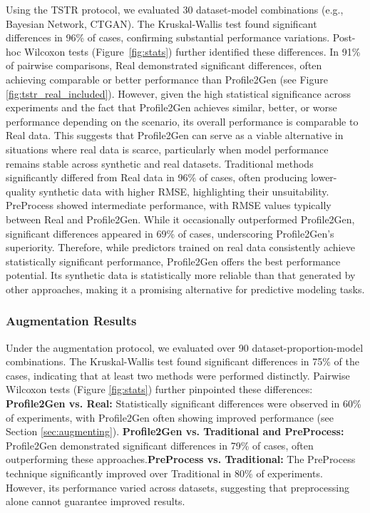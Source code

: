 \documentclass{article}
\theoremstyle{plain}
\theoremstyle{definition}
\theoremstyle{remark}
\begin{document}
Using the TSTR protocol, we evaluated 30 dataset-model combinations (e.g., Bayesian Network, CTGAN). The Kruskal-Wallis test found significant differences in 96\% of cases, confirming substantial performance variations. Post-hoc Wilcoxon tests (Figure~\ref{fig:stats}) further identified these differences.  In 91\% of pairwise comparisons, Real demonstrated significant differences, often achieving comparable or better performance than Profile2Gen (see Figure \ref{fig:tstr_real_included}). However, given the high statistical significance across experiments and the fact that Profile2Gen achieves similar, better, or worse performance depending on the scenario, its overall performance is comparable to Real data. This suggests that Profile2Gen can serve as a viable alternative in situations where real data is scarce, particularly when model performance remains stable across synthetic and real datasets. Traditional methods significantly differed from Real data in 96\% of cases, often producing lower-quality synthetic data with higher RMSE, highlighting their unsuitability. PreProcess showed intermediate performance, with RMSE values typically between Real and Profile2Gen. While it occasionally outperformed Profile2Gen, significant differences appeared in 69\% of cases, underscoring Profile2Gen's superiority. Therefore, while predictors trained on real data consistently achieve statistically significant performance, Profile2Gen offers the best performance potential. Its synthetic data is statistically more reliable than that generated by other approaches, making it a promising alternative for predictive modeling tasks.



\subsubsection{Augmentation Results}

Under the augmentation protocol, we evaluated over 90 dataset-proportion-model combinations. The Kruskal-Wallis test found significant differences in 75\% of the cases, indicating that at least two methods were performed distinctly. Pairwise Wilcoxon tests (Figure \ref{fig:stats}) further pinpointed these differences: \textbf{Profile2Gen vs. Real:} Statistically significant differences were observed in 60\% of experiments, with Profile2Gen often showing improved performance (see Section \ref{sec:augmenting}). \textbf{Profile2Gen vs. Traditional and PreProcess:} Profile2Gen demonstrated significant differences in 79\% of cases, often outperforming these approaches.\textbf{PreProcess vs. Traditional:} The PreProcess technique significantly improved over Traditional in 80\% of experiments. However, its performance varied across datasets, suggesting that preprocessing alone cannot guarantee improved results.
\end{document}
